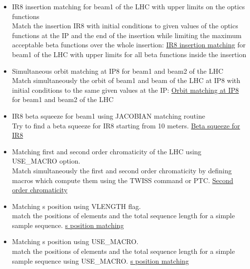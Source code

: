 \begin{itemize}
   \item IR8 insertion matching for beam1 of the LHC with upper
     limits on the optics functions\\ 
     Match the insertion IR8 with initial conditions to given values
     of the optics  functions at the IP and the end of the insertion
     while limiting the maximum acceptable beta functions over the
     whole insertion:  
     \href{http://cern.ch/madx/madX/examples/match/lhc.insertion-upper/job.lhc.insertion-upper.madx}{IR8
       insertion matching} for beam1 of the LHC with upper limits for
     all beta functions inside the insertion 
     
   \item Simultaneous orbit matching at IP8 for beam1 and beam2 of
     the LHC\\ 
     Match simultaneously the orbit of beam1 and beam of the LHC at
     IP8  with initial conditions to the same given values at the IP:  
     \href{http://cern.ch/madx/madX/examples/match/lhc.iporbit/job.lhc.iporbit.madx}{Orbit
       matching at IP8} for beam1 and beam2 of the LHC 
     
   \item IR8 beta squeeze for beam1 using JACOBIAN matching routine\\
     Try to find a beta squeeze for IR8 starting from 10 meters. 
     \href{http://cern.ch/madx/madX/examples/match/lhcV65.ir8squeeze/job.lhcV65.ir8squeeze.madx}{Beta
       squeeze for IR8} 
     
   \item Matching first and second order chromaticity of the LHC
     using USE\_MACRO option. \\
     Match simultaneously the first and second order chromaticity by
     defining macros which compute them using the TWISS command or
     PTC.  
     \href{http://cern.ch/madx/madX/examples/match/lhc.qpp/job.lhc.qpp.madx}{Second
       order chromaticity} 
     
   \item Matching s position using VLENGTH flag.\\
     match the positions of elements and the total sequence length
     for a simple sample sequence.  
     \href{http://cern.ch/madx/madX/examples/match/s-match/job.s-match.madx}{s position matching}
     
   \item Matching s position using USE\_MACRO.\\
     match the positions of elements and the total sequence length for a simple sample sequence using USE\_MACRO. 
     \href{http://cern.ch/madx/madX/examples/match/s-match-usemacro/job.s-match-usemacro.madx}{s position matching}
     
\end{itemize}


